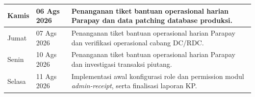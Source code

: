 \begin{center}
\begin{longtable}{|p{2.0cm}|p{2.5cm}|p{8.5cm}|}
Kamis & 06 Ags 2026 & Penanganan tiket bantuan operasional harian Parapay dan data patching database produksi. \\ \hline
Jumat & 07 Ags 2026 & Penanganan tiket bantuan operasional harian Parapay dan verifikasi operasional cabang DC/RDC. \\ \hline
Senin & 10 Ags 2026 & Penanganan tiket bantuan operasional harian Parapay dan investigasi transaksi piutang. \\ \hline
Selasa & 11 Ags 2026 & Implementasi awal konfigurasi role dan permission modul \textit{admin-receipt}, serta finalisasi laporan KP. \\ \hline
\end{longtable}
\end{center}
